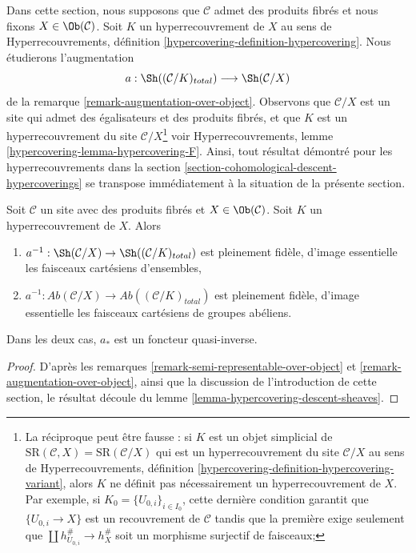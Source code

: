 \noindent
Dans cette section, nous supposons que $\mathcal{C}$ admet des produits fibrés
et nous fixons $X \in \Ob(\mathcal{C})$. Soit $K$ un hyperrecouvrement de $X$
au sens de
Hyperrecouvrements, définition \ref{hypercovering-definition-hypercovering}.
Nous étudierons l'augmentation
$$
a : \Sh((\mathcal{C}/K)_{total}) \longrightarrow \Sh(\mathcal{C}/X)
$$
de la remarque \ref{remark-augmentation-over-object}.
Observons que $\mathcal{C}/X$ est un site qui admet des égalisateurs
et des produits fibrés, et que $K$ est un hyperrecouvrement
du site $\mathcal{C}/X$\footnote{La réciproque peut être fausse :
si $K$ est un objet simplicial de
$\text{SR}(\mathcal{C}, X) = \text{SR}(\mathcal{C}/X)$
qui est un hyperrecouvrement du site $\mathcal{C}/X$ au sens de
Hyperrecouvrements, définition \ref{hypercovering-definition-hypercovering-variant},
alors $K$ ne définit pas nécessairement un hyperrecouvrement de $X$.
Par exemple, si $K_0 = \{U_{0, i}\}_{i \in I_0}$,
cette dernière condition garantit que
$\{U_{0, i} \to X\}$ est un recouvrement de $\mathcal{C}$
tandis que la première exige seulement que
$\coprod h_{U_{0, i}}^\# \to h_X^\#$ soit un morphisme surjectif
de faisceaux;} voir Hyperrecouvrements, lemme
\ref{hypercovering-lemma-hypercovering-F}.
Ainsi, tout résultat démontré pour les hyperrecouvrements
dans la section \ref{section-cohomological-descent-hypercoverings}
se transpose immédiatement à la situation de la présente section.

\begin{lemma}
\label{lemma-hypercovering-X-descent-sheaves}
Soit $\mathcal{C}$ un site avec des produits fibrés et $X \in \Ob(\mathcal{C})$.
Soit $K$ un hyperrecouvrement de $X$. Alors
\begin{enumerate}
\item $a^{-1} : \Sh(\mathcal{C}/X) \to \Sh((\mathcal{C}/K)_{total})$
est pleinement fidèle, d'image essentielle les faisceaux cartésiens d'ensembles,
\item $a^{-1} : \textit{Ab}(\mathcal{C}/X) \to
\textit{Ab}((\mathcal{C}/K)_{total})$
est pleinement fidèle, d'image essentielle les faisceaux cartésiens
de groupes abéliens.
\end{enumerate}
Dans les deux cas, $a_*$ est un foncteur quasi-inverse.
\end{lemma}

\begin{proof}
D'après les remarques \ref{remark-semi-representable-over-object} et
\ref{remark-augmentation-over-object}, ainsi que la discussion de
l'introduction de cette section,
le résultat découle du lemme \ref{lemma-hypercovering-descent-sheaves}.
\end{proof}

